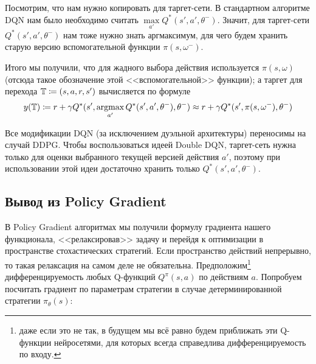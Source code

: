 Посмотрим, что нам нужно копировать для таргет-сети. В стандартном алгоритме DQN нам было необходимо считать $\max\limits_{a'} Q^*(s', a', \theta^{-})$. Значит, для таргет-сети $Q^*(s', a', \theta^{-})$ нам тоже нужно знать аргмаксимум, для чего будем хранить старую версию вспомогательной функции $\pi(s, \omega^{-})$.

Итого мы получили, что для жадного выбора действия используется $\pi(s, \omega)$ (отсюда такое обозначение этой <<вспомогательной>> функции); а таргет для перехода $\mathbb{T} \coloneqq (s, a, r, s')$ вычисляется по формуле
$$y(\mathbb{T}) \coloneqq r + \gamma Q^*(s', \mathop{\mathrm{argmax}}_{a'} Q^*(s', a', \theta^{-}), \theta^{-}) \approx r + \gamma Q^*(s', \pi(s, \omega^{-}), \theta^{-})$$

\begin{remark}
Все модификации DQN (за исключением дуэльной архитектуры) переносимы на случай DDPG. Чтобы воспользоваться идеей Double DQN, таргет-сеть нужна только для оценки выбранного текущей версией действия $a'$, поэтому при использовании этой идеи достаточно хранить только $Q^*(s', a', \theta^{-})$.
\end{remark}

\subsection{Вывод из Policy Gradient}


В Policy Gradient алгоритмах мы получили формулу градиента нашего функционала, <<релаксировав>> задачу и перейдя к оптимизации в пространстве стохастических стратегий. Если пространство действий непрерывно, то такая релаксация на самом деле не обязательна. Предположим\footnote{даже если это не так, в будущем мы всё равно будем приближать эти Q-функции нейросетями, для которых всегда справедлива дифференцируемость по входу.} дифференцируемость любых Q-функций $Q^{\pi}(s, a)$ по действиям $a$. Попробуем посчитать градиент по параметрам стратегии в случае детерминированной стратегии $\pi_\theta(s)$:

